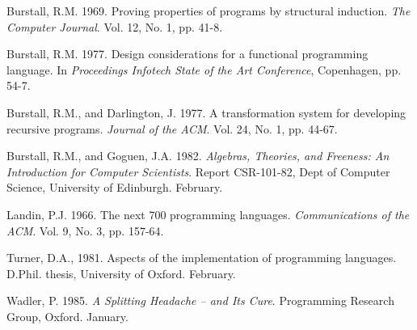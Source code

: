 \begin{references}
    \item Burstall, R.M. 1969. Proving properties of programs by structural induction. \textit{The Computer Journal}. Vol. 12, No. 1, pp. 41-8.
    \item Burstall, R.M. 1977. Design considerations for a functional programming language. In \textit{Proceedings Infotech State of the Art Conference}, Copenhagen, pp. 54-7.
    \item Burstall, R.M., and Darlington, J. 1977. A transformation system for developing recursive programs. \textit{Journal of the ACM}. Vol. 24, No. 1, pp. 44-67.
    \item Burstall, R.M., and Goguen, J.A. 1982. \textit{Algebras, Theories, and Freeness: An Introduction for Computer Scientists}. Report CSR-101-82, Dept of Computer Science, University of Edinburgh. February.
    \item Landin, P.J. 1966. The next 700 programming languages. \textit{Communications of the ACM}. Vol. 9, No. 3, pp. 157-64.
    \item Turner, D.A., 1981. Aspects of the implementation of programming languages. D.Phil. thesis, University of Oxford. February.
    \item Wadler, P. 1985. \textit{A Splitting Headache -- and Its Cure}. Programming Research Group, Oxford. January.
\end{references}